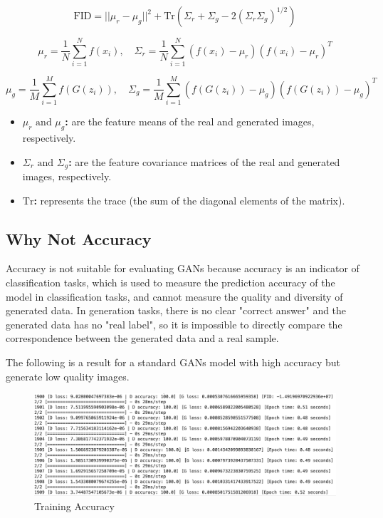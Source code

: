 \begin{equation}
    \text{FID} = || \mu_r - \mu_g ||^2 + \text{Tr}(\Sigma_r + \Sigma_g - 2(\Sigma_r \Sigma_g)^{1/2})
\end{equation}


\begin{equation}
    \mu_r = \frac{1}{N} \sum_{i=1}^{N} f(x_i), \quad \Sigma_r = \frac{1}{N} \sum_{i=1}^{N} (f(x_i) - \mu_r)(f(x_i) - \mu_r)^T
\end{equation}

\begin{equation}
    \mu_g = \frac{1}{M} \sum_{i=1}^{M} f(G(z_i)), \quad \Sigma_g = \frac{1}{M} \sum_{i=1}^{M} (f(G(z_i)) - \mu_g)(f(G(z_i)) - \mu_g)^T
\end{equation}


\begin{itemize}
    \item \textbf{ $\mu_r \text{ and } \mu_g$:}  are the feature means of the real and generated images, respectively.
    \item \textbf{$\Sigma_r \text{ and } \Sigma_g$:}  are the feature covariance matrices of the real and generated images, respectively.
    \item \textbf{ $\text{Tr}$:}  represents the trace (the sum of the diagonal elements of the matrix).
\end{itemize}


\subsection*{Why Not Accuracy}

Accuracy is not suitable for evaluating GANs because accuracy is an indicator of classification tasks, 
which is used to measure the prediction accuracy of the model in classification tasks, and cannot 
measure the quality and diversity of generated data. In generation tasks, there is no clear 
"correct answer" and the generated data has no "real label", so it is impossible to directly 
compare the correspondence between the generated data and a real sample. 

The following is a result for a standard GANs model with high accuracy but generate low quality images.


\begin{figure}[H]
    \centering
    \includegraphics[width=1.2\linewidth]{./Images/model_accuracy.jpg}
    \caption{Training Accuracy}
    \label{fig:my_picture}
\end{figure}

